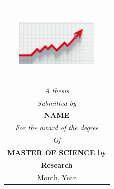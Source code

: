 \begin{titlepage}
\vspace*{1.5cm} %
\hspace{5cm} %
\begin{tabular}{c}
     \vspace{1cm}\includegraphics[width=40mm, height=40mm]{istockphoto-1157569047-612x612.jpg}\\
     
     
     
     \vspace{-0.25cm}\textit{A thesis}\\
     \vspace{-0.25cm}\textit{Submitted by}\\
     \vspace{2cm}
     \textbf{NAME}\\
     
     
     \vspace{-0.25cm}\textit{For the award of the degree}\\
     \vspace{-0.25cm}\textit{Of}\\
     \vspace{-0.25cm}\textbf{MASTER OF SCIENCE by}\\
     \vspace{-0.25cm}\textbf{Research}\\
     Month, Year
    
\end{tabular}\\

\end{titlepage}